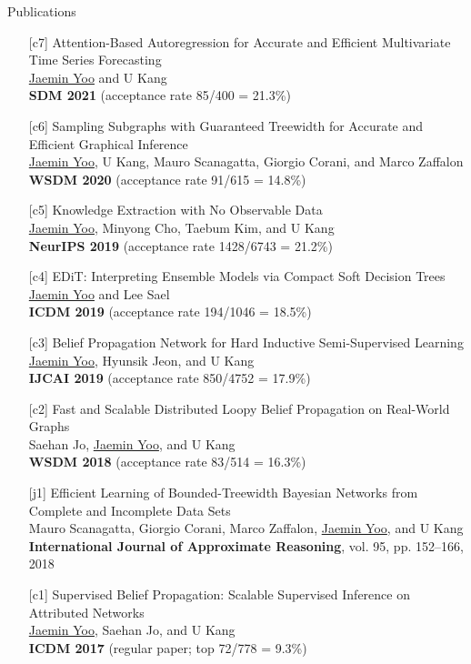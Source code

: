 \documentclass{resume} %
\begin{document}
\begin{rSection}{Publications}
\begin{enumerate}
	\item[{[c7]}]
		Attention-Based Autoregression for Accurate and Efficient Multivariate Time Series Forecasting \\
		\underline{Jaemin Yoo} and U Kang \\
		\textbf{SDM 2021} (acceptance rate 85/400 = 21.3\%)

	\item[{[c6]}]
		Sampling Subgraphs with Guaranteed Treewidth for Accurate and Efficient Graphical Inference \\
		\underline{Jaemin Yoo}, U Kang, Mauro Scanagatta, Giorgio Corani, and Marco Zaffalon \\
		\textbf{WSDM 2020} (acceptance rate 91/615 = 14.8\%)

	\item[{[c5]}]
		Knowledge Extraction with No Observable Data \\
		\underline{Jaemin Yoo}, Minyong Cho, Taebum Kim, and U Kang \\
		\textbf{NeurIPS 2019} (acceptance rate 1428/6743 = 21.2\%)

	\item[{[c4]}]
		EDiT: Interpreting Ensemble Models via Compact Soft Decision Trees \\
		\underline{Jaemin Yoo} and Lee Sael \\
		\textbf{ICDM 2019} (acceptance rate 194/1046 = 18.5\%)

	\item[{[c3]}]
		Belief Propagation Network for Hard Inductive Semi-Supervised Learning \\
		\underline{Jaemin Yoo}, Hyunsik Jeon, and U Kang \\
		\textbf{IJCAI 2019} (acceptance rate 850/4752 = 17.9\%)

	\item[{[c2]}]
		Fast and Scalable Distributed Loopy Belief Propagation on Real-World Graphs \\
		Saehan Jo, \underline{Jaemin Yoo}, and U Kang \\
		\textbf{WSDM 2018} (acceptance rate 83/514 = 16.3\%)

	\item[{[j1]}]
		Efficient Learning of Bounded-Treewidth Bayesian Networks from Complete and Incomplete Data Sets \\
		Mauro Scanagatta, Giorgio Corani, Marco Zaffalon, \underline{Jaemin Yoo}, and U Kang \\
		\textbf{International Journal of Approximate Reasoning}, vol. 95, pp. 152--166, 2018

	\item[{[c1]}]
		Supervised Belief Propagation: Scalable Supervised Inference on Attributed Networks \\
		\underline{Jaemin Yoo}, Saehan Jo, and U Kang \\
		\textbf{ICDM 2017} (regular paper; top 72/778 = 9.3\%)

\end{enumerate}
\end{rSection}
\end{document}
